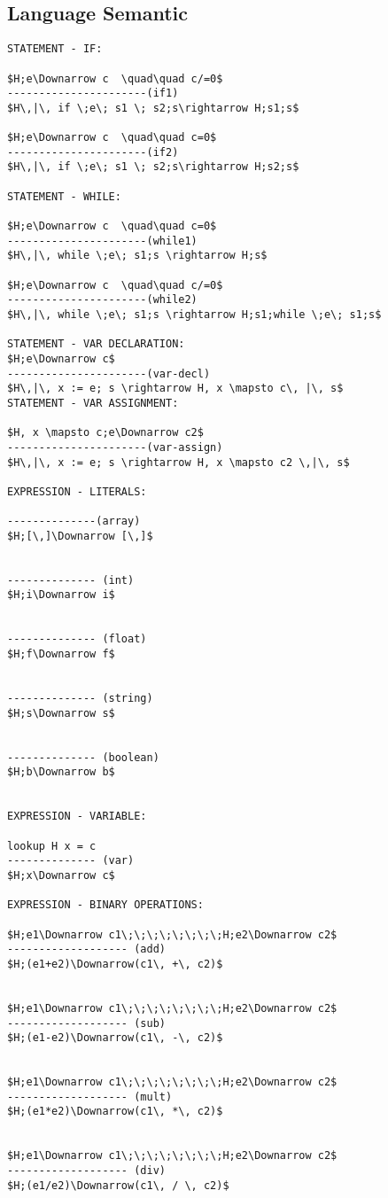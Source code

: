 \documentclass[11pt, a4paper]{article}
\begin{document}
\subsection*{Language Semantic}
\begin{lstlisting}
STATEMENT - IF:

$H;e\Downarrow c  \quad\quad c/=0$
----------------------(if1)
$H\,|\, if \;e\; s1 \; s2;s\rightarrow H;s1;s$

$H;e\Downarrow c  \quad\quad c=0$
----------------------(if2)
$H\,|\, if \;e\; s1 \; s2;s\rightarrow H;s2;s$

STATEMENT - WHILE:

$H;e\Downarrow c  \quad\quad c=0$
----------------------(while1)
$H\,|\, while \;e\; s1;s \rightarrow H;s$

$H;e\Downarrow c  \quad\quad c/=0$
----------------------(while2)
$H\,|\, while \;e\; s1;s \rightarrow H;s1;while \;e\; s1;s$

STATEMENT - VAR DECLARATION:
$H;e\Downarrow c$
----------------------(var-decl)
$H\,|\, x := e; s \rightarrow H, x \mapsto c\, |\, s$
STATEMENT - VAR ASSIGNMENT:

$H, x \mapsto c;e\Downarrow c2$
----------------------(var-assign)
$H\,|\, x := e; s \rightarrow H, x \mapsto c2 \,|\, s$

EXPRESSION - LITERALS:

--------------(array)
$H;[\,]\Downarrow [\,]$


-------------- (int)
$H;i\Downarrow i$


-------------- (float)
$H;f\Downarrow f$


-------------- (string)
$H;s\Downarrow s$


-------------- (boolean)
$H;b\Downarrow b$


EXPRESSION - VARIABLE:

lookup H x = c
-------------- (var)
$H;x\Downarrow c$

EXPRESSION - BINARY OPERATIONS:

$H;e1\Downarrow c1\;\;\;\;\;\;\;\;H;e2\Downarrow c2$
------------------- (add)
$H;(e1+e2)\Downarrow(c1\, +\, c2)$


$H;e1\Downarrow c1\;\;\;\;\;\;\;\;H;e2\Downarrow c2$
------------------- (sub)
$H;(e1-e2)\Downarrow(c1\, -\, c2)$


$H;e1\Downarrow c1\;\;\;\;\;\;\;\;H;e2\Downarrow c2$
------------------- (mult)
$H;(e1*e2)\Downarrow(c1\, *\, c2)$


$H;e1\Downarrow c1\;\;\;\;\;\;\;\;H;e2\Downarrow c2$
------------------- (div)
$H;(e1/e2)\Downarrow(c1\, / \, c2)$



\end{lstlisting}
\end{document}
